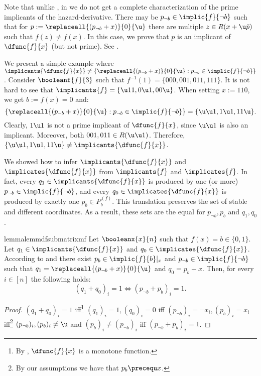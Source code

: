 \documentclass[acmsmall, nonacm, authorversion]{acmart}
\begin{document}
\begin{remark}
Note that unlike , in  we do not get a complete characterization of the prime implicants of the hazard-derivative. There may be $p_{\neg b}\in\implic{f}{\neg b}$ such that for $p:=\replaceall{(p_{\neg b}+x)}{0}{\u}$ there are multiple $z\in R(x+\u\check{p})$ such that $f(z)\neq f(x)$. In this case, we prove that $p$ is an implicant of $\dfunc{f}{x}$ (but not prime). See .
\end{remark}

\begin{example}\label{ex:prime-implicants-df} 
We present a simple example where $\implicants{\dfunc{f}{x}}\neq \{\replaceall{(p_{\neg b} + x)}{0}{\u} : \text{$p_{\neg b}\in \implic{f}{\neg b}$}\}$.  
Consider $\booleanf{f}{3}$ such that $f^{-1}(1)=\{000,001,011,111\}$. It is not hard to see that $\implicants{f}=\{\u 11,0 \u 1,00 \u\}$. When setting $x:=110$, we get $b:=f(x)=0$ and:
\[
\{\replaceall{(p_{\neg b} + x)}{0}{\u} : \text{$p_{\neg b}\in \implic{f}{\neg b}$}\} =\{\u\u 1,1 \u 1,11 \u\}.
\]
Clearly, $1 \u 1$ is not a prime implicant of $\dfunc{f}{x}$, since $\u\u 1$ is also an implicant. Moreover, both $001,011\in R(\u\u 1)$. Therefore, $\{\u\u 1,1 \u 1,11 \u\}\neq \implicants{\dfunc{f}{x}}$.
\end{example}

We showed how to infer $\implicants{\dfunc{f}{x}}$ and $\implicates{\dfunc{f}{x}}$ from $\implicants{f}$ and $\implicates{f}$. In fact, every $q_1\in \implicants{\dfunc{f}{x}}$ is produced by one (or more) $p_{\neg b}\in \implic{f}{\neg b}$, and every $q_0\in \implicates{\dfunc{f}{x}}$ is produced by exactly one $p_b\in P_b^{(f)}$. 
This translation preserves the set of stable and different coordinates. As a result, these sets are the equal for $p_{\neg b},p_b$ and $q_1,q_0$.

\begin{restatable}{lemma}{lemmdfsubmatrixmf}\label{lem:mdf-submatrix-mf} 
Let $\booleanx{x}{n}$ such that $f(x)=b\in\{0,1\}$. Let $q_1\in\implicants{\dfunc{f}{x}}$ and $q_0\in\implicates{\dfunc{f}{x}}$. According to  and  there exist $p_b\in\implic{f}{b}|_x$ and $p_{\neg b} \in \implic{f}{\neg b}$ such that $q_1=\replaceall{(p_{\neg b}+x)}{0}{\u}$ and $q_0=p_b+x$.
Then, for every $i\in [n]$ the following holds:
\[
(q_1+q_0)_i=1 \iff (p_{\neg b}+p_b)_i=1.
\]
\end{restatable}
\begin{proof}
$(q_1+q_0)_i=1$ iff\footnote{By , $\dfunc{f}{x}$ is a monotone function.} $(q_{1})_{i}=1, (q_{0})_{i}=0$ iff $(p_{\neg b})_{i}= \neg x_{i}, (p_{b})_{i}=x_{i}$ iff\footnote{By our assumptions we have that $p_{b} \precequ x$.} $(p_{\neg b})_{i}, (p_{b})_{i} \neq \u$ and $(p_{b})_{i} \neq (p_{\neg b})_{i}$ iff $(p_{\neg b}+p_b)_i=1$.
\end{proof}
\end{document}
